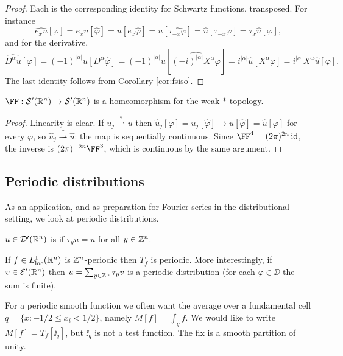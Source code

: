 \documentclass[a4paper]{scrartcl}
\newcommand{\id}{\operatorname{id}}
\newcommand{\Sch}{\mathcal{S}}
\newcommand{\Ecal}{\mathcal{E}}
\newcommand{\wsto}{\overset{*}{\rightharpoonup}}
\begin{document}
\begin{proof}
	Each is the corresponding identity for Schwartz functions, transposed. For instance
	$$\widehat{e_xu}[\varphi]=e_xu[\hat\varphi]=u[e_x\hat\varphi]=u[\widehat{\tau_{-x}\varphi}]=\hat u[\tau_{-x}\varphi]=\tau_x\hat u[\varphi],$$
	and for the derivative,
	$$\widehat{D^\alpha u}[\varphi]=(-1)^{|\alpha|}u[D^\alpha\hat\varphi]=(-1)^{|\alpha|}u\!\left[\widehat{(-i)^{|\alpha|}X^\alpha\varphi}\right]=i^{|\alpha|}\hat u[X^\alpha\varphi]=i^{|\alpha|}X^\alpha\hat u[\varphi].$$
	The last identity follows from Corollary \ref{cor:fsiso}.
\end{proof}

\begin{lemma}
	$\FF : \Sch'(\R^n)\to\Sch'(\R^n)$ is a homeomorphism for the weak-$*$ topology.
\end{lemma}

\begin{proof}
	Linearity is clear. If $u_j\wsto u$ then $\hat u_j[\varphi]=u_j[\hat\varphi]\to u[\hat\varphi]=\hat u[\varphi]$ for every $\varphi$, so $\hat u_j\wsto\hat u$: the map is sequentially continuous. Since $\FF^4=(2\pi)^{2n}\id$, the inverse is $(2\pi)^{-2n}\FF^3$, which is continuous by the same argument.
\end{proof}

\subsection{Periodic distributions}

As an application, and as preparation for Fourier series in the distributional setting, we look at periodic distributions.

\begin{definition}
	$u \in \mathcal{D}'(\mathbb{R}^n)$ is  if $\tau_yu=u$ for all $y\in\mathbb{Z}^n$.
\end{definition}

\begin{example}
	If $f\in L^1_{\mathrm{loc}}(\mathbb{R}^n)$ is $\mathbb{Z}^n$-periodic then $T_f$ is periodic. More interestingly, if $v \in \Ecal'(\R^n)$ then $u = \sum_{y\in\mathbb{Z}^n}\tau_yv$ is a periodic distribution (for each $\varphi\in\DD$ the sum is finite).
\end{example}

For a periodic smooth function we often want the average over a fundamental cell $q=\{x : -1/2\le x_i<1/2\}$, namely $M[f]=\int_qf$. We would like to write $M[f]=T_f[\ii_q]$, but $\ii_q$ is not a test function. The fix is a smooth partition of unity.
\end{document}
